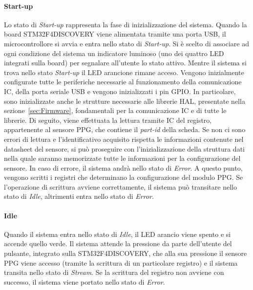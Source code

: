 \paragraph{Start-up}
Lo stato di \textit{Start-up} rappresenta la fase di inizializzazione del sistema. Quando la board STM32F4DISCOVERY viene alimentata tramite una porta USB, il microcontrollore si avvia e entra nello stato di \textit{Start-up}. Si è scelto di associare ad ogni condizione del sistema un indicatore luminoso (uno dei quattro LED integrati sulla board) per segnalare all'utente lo stato attivo. Mentre il sistema si trova nello stato \textit{Start-up} il LED arancione rimane acceso. Vengono inizialmente configurate tutte le periferiche necessarie al funzionamento della comunicazione IC, della porta seriale USB e vengono inizializzati i pin GPIO. In particolare, sono inizializzate anche le strutture necessarie alle librerie HAL, presentate nella sezione~\ref{sec:Firmware}, fondamentali per la comunicazione IC e di tutte le librerie. Di seguito, viene effettuata la lettura tramite IC del registro, appartenente al sensore PPG, che contiene il \textit{part-id} della scheda. Se non ci sono errori di lettura e l'identificativo acquisito rispetta le informazioni contenute nel datasheet del sensore, si può proseguire con l'inizializzazione della struttura dati nella quale saranno memorizzate tutte le informazioni per la configurazione del sensore. In caso di errore, il sistema andrà nello stato di \textit{Error}. A questo punto, vengono scritti i registri che determinano la configurazione del modulo PPG. Se l'operazione di scrittura avviene correttamente, il sistema può transitare nello stato di \textit{Idle}, altrimenti entra nello stato di \textit{Error}.
\paragraph{Idle}
Quando il sistema entra nello stato di \textit{Idle}, il LED arancio viene spento e si accende quello verde. Il sistema attende la pressione da parte dell'utente del pulsante, integrato sulla STM32F4DISCOVERY, che alla sua pressione il sensore PPG viene accesso (tramite la scrittura di un particolare registro) e il sistema transita nello stato di \textit{Stream}. Se la scrittura del registro non avviene con successo, il sistema viene portato nello stato di \textit{Error}.
